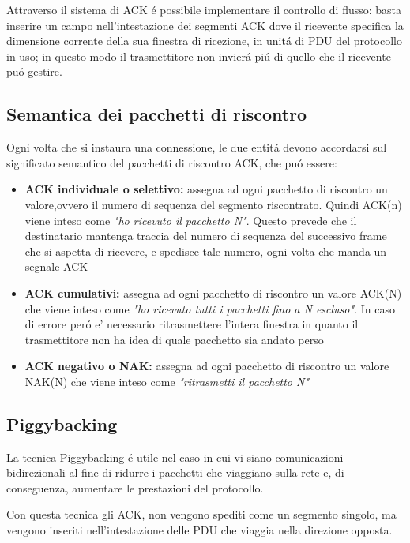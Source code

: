 \documentclass[12pt]{article}
\begin{document}
Attraverso il sistema di ACK \'e possibile implementare il controllo di flusso: basta inserire 
un campo nell'intestazione dei segmenti ACK dove il ricevente specifica la dimensione corrente della 
sua finestra di ricezione, in unit\'a di  PDU del protocollo in uso; in questo modo il trasmettitore non 
invier\'a pi\'u di quello che il ricevente pu\'o gestire.

\subsection{Semantica dei pacchetti di riscontro}\label{arq-semantica-dei-pacchetti-riscontro}
Ogni volta che si instaura una connessione, le due entit\'a devono accordarsi sul significato semantico del pacchetti 
di riscontro ACK, che pu\'o essere:
\begin{itemize}[noitemsep]
	\item \textbf{ACK individuale o selettivo:} assegna ad ogni pacchetto di riscontro un valore,ovvero il numero di 
		  sequenza del segmento riscontrato. Quindi ACK(n) viene inteso come \textit{"ho ricevuto il pacchetto N"}. 
		  Questo prevede che il destinatario mantenga traccia del numero di sequenza del successivo frame che si 
		  aspetta di ricevere, e spedisce tale numero, ogni volta che manda un segnale ACK
	\item \textbf{ACK cumulativi:} assegna ad ogni pacchetto di riscontro un valore ACK(N) che viene inteso come 
	      \textit{"ho ricevuto tutti i pacchetti fino a N escluso"}. In caso di errore per\'o e' necessario    
	      ritrasmettere l'intera finestra in quanto il trasmettitore non ha idea di quale pacchetto sia andato perso 
	      \item \textbf{ACK negativo o NAK:} assegna ad ogni pacchetto di riscontro un valore NAK(N) che viene inteso 
	      come \textit{"ritrasmetti il pacchetto N"}
\end{itemize}

\subsection{Piggybacking}\label{arq-piggybacking}
La tecnica Piggybacking \'e utile nel caso in cui vi siano comunicazioni bidirezionali al fine di
ridurre i pacchetti che viaggiano sulla rete e, di conseguenza, aumentare le prestazioni del
protocollo.

Con questa tecnica gli ACK, non vengono spediti come un segmento singolo, ma vengono inseriti nell'intestazione delle 
PDU che viaggia nella direzione opposta.
\end{document}
